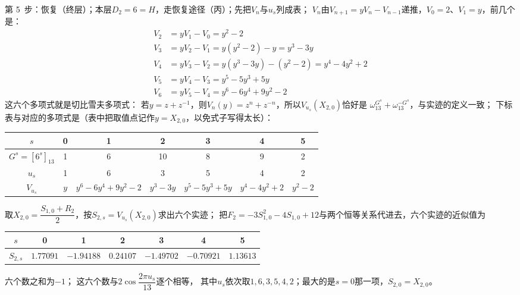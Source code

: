 \documentclass[UTF8,a4paper,11pt]{ctexart}
\begin{document}
第 5~步：恢复（终层）；本层$D_2=6=H$，走恢复途径（丙）；先把$V_n$与$u_s$列成表；
$V_n$由$V_{n+1}=yV_n-V_{n-1}$递推，$V_0=2$、$V_1=y$，前几个是：
\begin{align*}
 V_2&=yV_1-V_0=y^2-2\\
 V_3&=yV_2-V_1=y(y^2-2)-y=y^3-3y\\
 V_4&=yV_3-V_2=y(y^3-3y)-(y^2-2)=y^4-4y^2+2\\
 V_5&=yV_4-V_3=y^5-5y^3+5y\\
 V_6&=yV_5-V_4=y^6-6y^4+9y^2-2
\end{align*}
这六个多项式就是切比雪夫多项式：
若$y=z+z^{-1}$，则$V_n(y)=z^n+z^{-n}$，所以$V_{u_s}(X_{2,0})$恰好是
$\omega_{13}^{G^s}+\omega_{13}^{-G^s}$，与实迹的定义一致；
下标表与对应的多项式是（表中把取值点记作$y=X_{2,0}$，以免式子写得太长）：
\begin{center}
\begin{tabular}{c|cccccc}
\toprule
$s$ & 0&1&2&3&4&5\\
\midrule
$G^s=[6^s]_{13}$ & 1&6&10&8&9&2\\
$u_s$ & 1&6&3&5&4&2\\[2pt]
$V_{u_s}$ & $y$ & $y^6-6y^4+9y^2-2$
 & $y^3-3y$ & $y^5-5y^3+5y$ & $y^4-4y^2+2$ & $y^2-2$\\
\bottomrule
\end{tabular}
\end{center}
取$X_{2,0}=\dfrac{S_{1,0}+R_2}{2}$，按$S_{2,s}=V_{u_s}(X_{2,0})$求出六个实迹；
把$F_2=-3S_{1,0}^2-4S_{1,0}+12$与两个恒等关系代进去，六个实迹的近似值为
\begin{center}
\begin{tabular}{c|cccccc}
\toprule
$s$ & 0&1&2&3&4&5\\
\midrule
$S_{2,s}$ & $1.77091$&$-1.94188$&$0.24107$&$-1.49702$&$-0.70921$&$1.13613$\\
\bottomrule
\end{tabular}
\end{center}
六个数之和为$-1$；
这六个数与$2\cos\dfrac{2\pi u_s}{13}$逐个相等，
其中$u_s$依次取$1,6,3,5,4,2$；最大的是$s=0$那一项，$S_{2,0}=X_{2,0}$。\par
\end{document}
